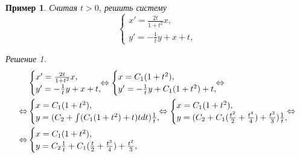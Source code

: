 \documentclass[a5paper, 11pt]{article}
\theoremstyle{definition}
\theoremstyle{plain}
\newtheorem{Ex}{Пример}
\theoremstyle{remark}
\newtheorem*{Solution}{Решение}
\begin{document}
	\begin{Ex}
		Считая $t>0$, решить систему
		\[
		\begin{cases}
			x'=\frac{2t}{1+t^2}x,\\
			y'=-\frac1t y +x + t,
		\end{cases}
		\]
		\begin{Solution}
			\[
			\begin{split}
			&\begin{cases}
				x'=\frac{2t}{1+t^2}x,\\
				y'=-\frac1t y +x + t,
			\end{cases}
		\hspace{-0.5cm}\Leftrightarrow
			\begin{cases}
				x = C_1(1+t^2),\\
				y'=-\frac1t y +C_1(1+t^2) + t,
			\end{cases}
		\hspace{-0.5cm}\Leftrightarrow\\
		\Leftrightarrow&
		\begin{cases}
			x = C_1(1+t^2),\\
			y= (C_2 + \int (C_1(1+t^2)+t) t dt)\frac1t,
		\end{cases}
	\hspace{-0.5cm}\Leftrightarrow
	\begin{cases}
		x = C_1(1+t^2),\\
		y= (C_2 + C_1(\frac{t^2}{2} + \frac{t^4}{4}) + \frac{t^3}{3})\frac1t,
	\end{cases}
\hspace{-0.5cm}\Leftrightarrow\\
\Leftrightarrow&
	\begin{cases}
	x = C_1(1+t^2),\\
	y= C_2\frac1t + C_1(\frac{t}{2} + \frac{t^3}{4}) + \frac{t^2}{3},
\end{cases}
	\end{split}
			\]
		\end{Solution}
	\end{Ex}
	
\end{document}
